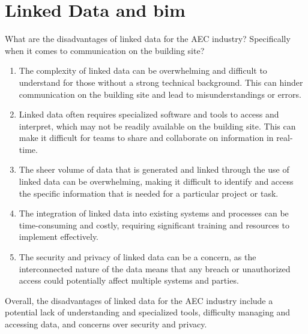\section*{Linked Data and \ac{bim}}
\begin{description}
	\me What are the disadvantages of linked data for the AEC industry? Specifically when it comes to communication on the building site?

	\gpt
	\begin{enumerate}
		\item The complexity of linked data can be overwhelming and difficult to understand for those without a strong technical background. This can hinder communication on the building site and lead to misunderstandings or errors.
		\item Linked data often requires specialized software and tools to access and interpret, which may not be readily available on the building site. This can make it difficult for teams to share and collaborate on information in real-time.
		\item The sheer volume of data that is generated and linked through the use of linked data can be overwhelming, making it difficult to identify and access the specific information that is needed for a particular project or task.
		\item The integration of linked data into existing systems and processes can be time-consuming and costly, requiring significant training and resources to implement effectively.
		\item The security and privacy of linked data can be a concern, as the interconnected nature of the data means that any breach or unauthorized access could potentially affect multiple systems and parties.
	\end{enumerate}
	Overall, the disadvantages of linked data for the AEC industry include a potential lack of understanding and specialized tools, difficulty managing and accessing data, and concerns over security and privacy.



\end{description}

